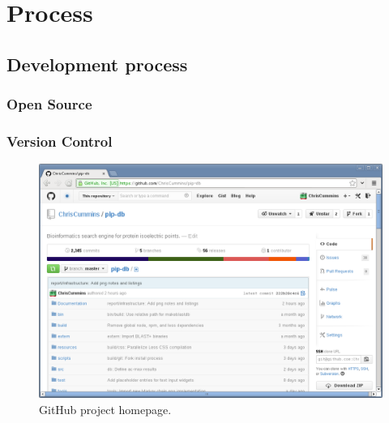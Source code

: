 \chapter{Process}\label{chap:process}


\section{Development process}\label{sec:development-process}


\cite{martin2003agile, highsmith2001agile}


\cite{balduino2007introduction, kroll2006agility}


\subsection{Open Source}\label{subsec:open-source}

\cite{raymond1999cathedral, weber2004success}


\subsection{Version Control}\label{subsec:version-control}

\cite{finley2011github}


\begin{figure}[H]
\centering
    \includegraphics[width=\textwidth]{assets/github}
\caption[GitHub project homepage]
        {GitHub project homepage.}
\label{fig:github-project}
\end{figure}


